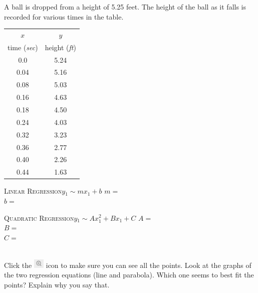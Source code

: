 \documentclass[12pt,letterpaper]{memoir}
\begin{document}
\myWideProblemWithContent 
{
    A ball is dropped from a height of 5.25 feet.
    The height of the ball as it falls is recorded 
    for various times in the table.\\[0.5em]
    \begin{minipage}{0.35\textwidth}
        \footnotesize
        \begin{tabular}{cc}
            $x$ & $y$ \\ 
            time ({\itshape sec}) & height ({\itshape ft}) \\
            \midrule 
            0.0   & 5.24 \\
            0.04  & 5.16 \\ 
            0.08  & 5.03 \\ 
            0.16  & 4.63 \\ 
            0.18  & 4.50 \\ 
            0.24  & 4.03 \\ 
            0.32  & 3.23 \\ 
            0.36  & 2.77 \\ 
            0.40  & 2.26 \\
            0.44  & 1.63 \\
            \bottomrule
        \end{tabular}
        \end{minipage}
    \begin{minipage}{0.64\textwidth}
        \begin{tcolorbox}[colback=white,width=\textwidth]
            \small
            \scshape{Linear Regression}\hfill$y_1 \sim m x_1 + b$
            \tcblower
            $m =$  \\
            $b =$ 
        \end{tcolorbox}
        \begin{tcolorbox}[colback=white,width=\textwidth]
            \small
            \scshape{Quadratic Regression}\hfill$y_1 \sim A x_1^2 + B x_1 + C$
            \tcblower
            $A =$  \\
            $B =$ \\
            $C =$ 
        \end{tcolorbox}
    \end{minipage}\\[1\onelineskip]
    Click the 
    \includegraphics[width=0.2in]{magnifying-glass-plus.png} 
    icon to make sure you can see all the points.
    Look at the graphs of the two regression equations 
    (line and parabola).
    Which one seems to best fit the points?
    Explain why you say that.
    \vspace{0.7in}
}
\end{document}
